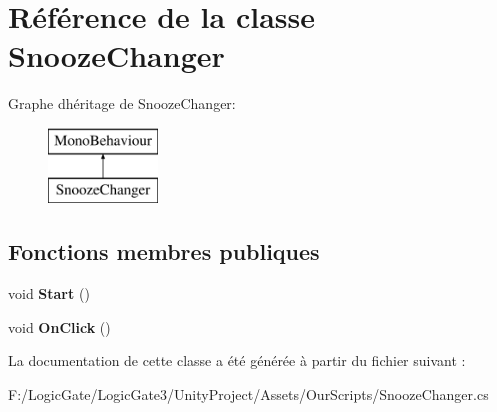 \hypertarget{class_snooze_changer}{}\section{Référence de la classe Snooze\+Changer}
\label{class_snooze_changer}
Graphe d\textquotesingle{}héritage de Snooze\+Changer\+:\begin{figure}[H]
\begin{center}
\leavevmode
\includegraphics[height=2.000000cm]{class_snooze_changer}
\end{center}
\end{figure}
\subsection*{Fonctions membres publiques}
\begin{DoxyCompactItemize}
\item 
\mbox{\label{class_snooze_changer_a24716e3c9890779c20464008605fd603}} 
void {\bfseries Start} ()
\item 
\mbox{\label{class_snooze_changer_a9ffaa0bbed0e72bfd0d76be47075e82e}} 
void {\bfseries On\+Click} ()
\end{DoxyCompactItemize}


La documentation de cette classe a été générée à partir du fichier suivant \+:\begin{DoxyCompactItemize}
\item 
F\+:/\+Logic\+Gate/\+Logic\+Gate3/\+Unity\+Project/\+Assets/\+Our\+Scripts/Snooze\+Changer.\+cs\end{DoxyCompactItemize}
